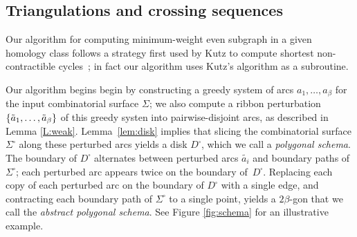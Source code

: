 \documentclass[letterpaper,review]{siamart190516}
\begin{document}
\subsection{Triangulations and crossing sequences}
\label{SS:homotopy-triangulation}

Our algorithm for computing minimum-weight even subgraph in a given homology class follows a strategy first used by Kutz to compute shortest non-contractible cycles~\cite{k-csnco-06}; in fact our algorithm uses Kutz's algorithm as a subroutine.

Our algorithm begins begin by constructing a greedy system of arcs $a_1, \dots, a_\beta$ for the input combinatorial surface $\Sigma$; we also compute a ribbon perturbation $\{ \tilde{a}_1, \dots, \tilde{a}_\beta \}$ of this greedy systen into pairwise-disjoint arcs, as described in Lemma \ref{L:weak}.  Lemma~\ref{lem:disk} implies that slicing the combinatorial surface $\Sigma^\square$ along these perturbed arcs yields a disk $D^\square$, which we call a \emph{polygonal schema}.  The boundary of $D^\square$ alternates between perturbed arcs $\tilde{a_i}$ and boundary paths of $\Sigma^\square$; each perturbed arc appears twice on the boundary of~$D^\square$.  Replacing each copy of each perturbed arc on the boundary of $D^\square$ with a single edge, and contracting each boundary path of $\Sigma^\square$ to a single point, yields a $2\beta$-gon that we call the \emph{abstract polygonal schema}.  See Figure \ref{fig:schema} for an illustrative example.
\end{document}
